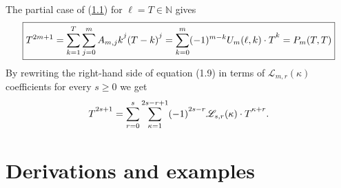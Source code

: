 \documentclass[11pt, letterpaper]{amsart}
\theoremstyle{definition}
\theoremstyle{remark}
\numberwithin{equation}{section}
\begin{document}
The partial case of (\hyperref[f1]{1.1}) for $\ell=T\in\mathbb{N}$ gives
\begin{equation}\label{main_identity}
\boxed
{
T^{2m+1}=\sum_{k=1}^{T}\sum_{j=0}^m A_{m,j}k\strut^j(T-k)\strut^j=\sum_{k=0}^{m}(-1)^{m-k}U_m(\ell, k)\cdot T\strut^k=P_m(T,T)
}
\end{equation}
By rewriting the right-hand side of equation (1.9) in terms of $\mathscr{L}_{m,r}(\kappa)$ coefficients for every $s\geq 0$ we get
\begin{equation}
T\strut^{2s+1}=\sum_{r=0}^{s}\sum_{\kappa=1}^{2s-r+1} (-1)\strut^{2s-r} \mathscr{L}_{s,r}(\kappa) \cdot T\strut^{\kappa+r}.
\end{equation}
\section{Derivations and examples}
\end{document}
